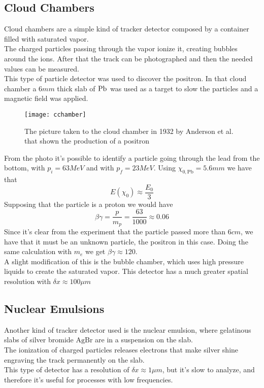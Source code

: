 \documentclass[../qm.tex]{subfiles}
\begin{document}
\subsection{Cloud Chambers}
Cloud chambers are a simple kind of tracker detector composed by a container filled with saturated vapor.\\
The charged particles passing through the vapor ionize it, creating bubbles around the ions. After that the track can be photographed and then the needed values can be measured.\\
This type of particle detector was used to discover the positron. In that cloud chamber a $6\unit{mm}$ thick slab of ${}_{}^{}{\mathrm{Pb}}_{}$ was used as a target to slow the particles and a magnetic field was applied.\\
\begin{figure}[H]
	\centering
	\texttt{[image: cchamber]}
	\caption{The picture taken to the cloud chamber in 1932 by Anderson et al. that shown the production of a positron}
	\label{fig:positrondisc}
\end{figure}
From the photo it's possible to identify a particle going through the lead from the bottom, with $p_i=63\unit{MeV}$ and with $p_f=23\unit{MeV}$. Using $\chi_{0,\mathrm{Pb}}=5.6\unit{mm}$ we have that
\begin{equation*}
	E(\chi_0)\approx\frac{E_0}{3}
\end{equation*}
Supposing that the particle is a proton we would have
\begin{equation*}
	\beta\gamma=\frac{p}{m_p}=\frac{63}{1000}\approx0.06
\end{equation*}
Since it's clear from the experiment that the particle passed more than $6\unit{cm}$, we have that it must be an unknown particle, the positron in this case. Doing the same calculation with $m_e$ we get $\beta\gamma\approx120$.\\
A slight modification of this is the bubble chamber, which uses high pressure liquids to create the saturated vapor. This detector has a much greater spatial resolution with $\delta x\approx100\unit{\mu m}$
\subsection{Nuclear Emulsions}
Another kind of tracker detector used is the nuclear emulsion, where gelatinous slabs of silver bromide $\mathrm{AgBr}$ are in a suspension on the slab.\\
The ionization of charged particles releases electrons that make silver shine engraving the track permanently on the slab.\\
This type of detector has a resolution of $\delta x\approx1\unit{\mu m}$, but it's slow to analyze, and therefore it's useful for processes with low frequencies.
\end{document}
